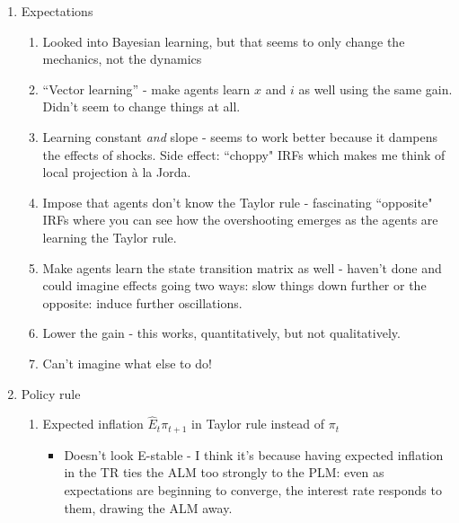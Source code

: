 \documentclass[11pt]{article}
\renewcommand{\[}{\begin{equation}}
\renewcommand{\]}{\end{equation}}
\begin{document}
\begin{enumerate}
\item Expectations
\begin{enumerate}
\item Looked into Bayesian learning, but that seems to only change the mechanics, not the dynamics
\item ``Vector learning'' - make agents learn $x$ and $i$ as well using the same gain. Didn't seem to change things at all.
\item Learning constant \emph{and} slope - seems to work better because it dampens the effects of shocks. Side effect: ``choppy" IRFs which makes me think of local projection \`a la Jorda.
\item Impose that agents don't know the Taylor rule - fascinating ``opposite" IRFs where you can see how the overshooting emerges as the agents are learning the Taylor rule.
\item Make agents learn the state transition matrix as well - haven't done and could imagine effects going two ways: slow things down further or the opposite: induce further oscillations.
\item Lower the gain - this works, quantitatively, but not qualitatively.
\item Can't imagine what else to do!
\end{enumerate}

\item Policy rule
\begin{enumerate}
\item Expected inflation $\hat{E}_t\pi_{t+1}$ in Taylor rule instead of $\pi_t$
\begin{itemize}
\item Doesn't look E-stable - I think it's because having expected inflation in the TR ties the ALM too strongly to the PLM: even as expectations are beginning to converge, the interest rate responds to them, drawing the ALM away.
\end{itemize}


\end{enumerate}
\end{enumerate}
\end{document}
